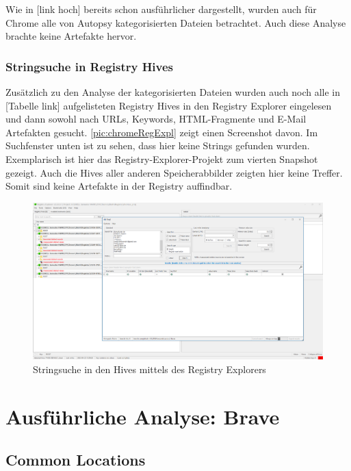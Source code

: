 \begin{appendices}
Wie in [link hoch] bereits schon ausführlicher dargestellt, wurden auch für Chrome alle von Autopsy kategorisierten Dateien betrachtet. Auch diese Analyse brachte keine Artefakte hervor.

\subsubsection*{Stringsuche in Registry Hives}

Zusätzlich zu den Analyse der kategorisierten Dateien wurden auch noch alle in [Tabelle link] aufgelisteten Registry Hives in den Registry Explorer eingelesen und dann sowohl nach URLs, Keywords, HTML-Fragmente und E-Mail Artefakten gesucht. \autoref{pic:chromeRegExpl} zeigt einen Screenshot davon. Im Suchfenster unten ist zu sehen, dass hier keine Strings gefunden wurden. Exemplarisch ist hier das Registry-Explorer-Projekt zum vierten Snapshot gezeigt. Auch die Hives aller anderen Speicherabbilder zeigten hier keine Treffer. Somit sind keine Artefakte in der Registry auffindbar.

\begin{figure}[h!]
	\centering
	\includegraphics[width=\textwidth]{bilder/RegExpl.png}
	\caption{Stringsuche in den Hives mittels des Registry Explorers}
	\label{pic:chromeRegExpl}
\end{figure}


\section{Ausführliche Analyse: Brave}
\subsection{Common Locations}
\label{subsection:appendix-brave-common-locations}

\end{appendices}
